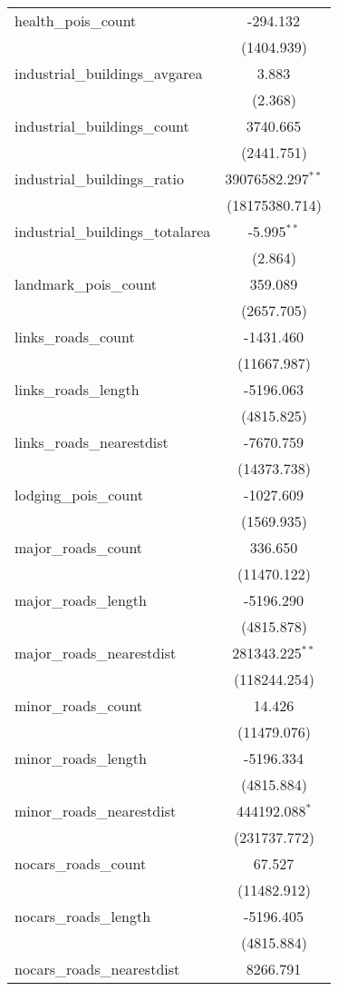 \begin{table}[!htbp]
\begin{tabular}{@{\extracolsep{5pt}}lc}
 health_pois_count & -294.132$^{}$ \\
  & (1404.939) \\
 industrial_buildings_avgarea & 3.883$^{}$ \\
  & (2.368) \\
 industrial_buildings_count & 3740.665$^{}$ \\
  & (2441.751) \\
 industrial_buildings_ratio & 39076582.297$^{**}$ \\
  & (18175380.714) \\
 industrial_buildings_totalarea & -5.995$^{**}$ \\
  & (2.864) \\
 landmark_pois_count & 359.089$^{}$ \\
  & (2657.705) \\
 links_roads_count & -1431.460$^{}$ \\
  & (11667.987) \\
 links_roads_length & -5196.063$^{}$ \\
  & (4815.825) \\
 links_roads_nearestdist & -7670.759$^{}$ \\
  & (14373.738) \\
 lodging_pois_count & -1027.609$^{}$ \\
  & (1569.935) \\
 major_roads_count & 336.650$^{}$ \\
  & (11470.122) \\
 major_roads_length & -5196.290$^{}$ \\
  & (4815.878) \\
 major_roads_nearestdist & 281343.225$^{**}$ \\
  & (118244.254) \\
 minor_roads_count & 14.426$^{}$ \\
  & (11479.076) \\
 minor_roads_length & -5196.334$^{}$ \\
  & (4815.884) \\
 minor_roads_nearestdist & 444192.088$^{*}$ \\
  & (231737.772) \\
 nocars_roads_count & 67.527$^{}$ \\
  & (11482.912) \\
 nocars_roads_length & -5196.405$^{}$ \\
  & (4815.884) \\
 nocars_roads_nearestdist & 8266.791$^{}$ \\

\end{tabular}
\end{table}
